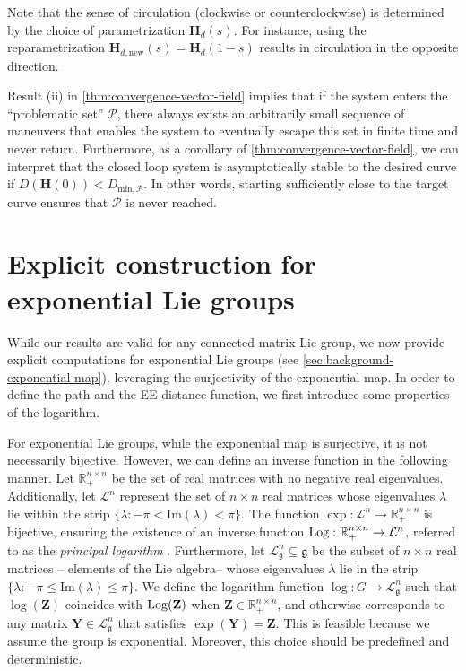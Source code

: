 Note that the sense of circulation (clockwise or counterclockwise) is determined by the choice of parametrization $\mathbf{H}_d(s)$. For instance, using the reparametrization $\mathbf{H}_{d,\text{new}}(s) = \mathbf{H}_d(1-s)$ results in circulation in the opposite direction.

Result (ii) in \cref{thm:convergence-vector-field} implies that if the system enters the ``problematic set'' $\mathcal{P}$, there always exists an arbitrarily small sequence of maneuvers that enables the system to eventually escape this set in finite time and never return. Furthermore, as a corollary of \cref{thm:convergence-vector-field}, we can interpret that the closed loop system is asymptotically stable to the desired curve if $D(\mathbf{H}(0)) < D_{\text{min}, \mathcal{P}}$. In other words, starting sufficiently close to the target curve ensures that $\mathcal{P}$ is never reached.
\section{Explicit construction for exponential Lie groups}\label{sec:kinematic-path-ee-dist-exp-group} %
While our results are valid for any connected matrix Lie group, we now provide explicit computations for exponential Lie groups (see \cref{sec:background-exponential-map}), leveraging the surjectivity of the exponential map. In order to define the path and the EE-distance function, we first introduce some properties of the logarithm.

For exponential Lie groups, while the exponential map is surjective, it is not necessarily bijective. However, we can define an inverse function in the following manner. Let $\mathbb{R}_+^{n\times n}$ be the set of real matrices with no negative real eigenvalues. Additionally, let $\mathcal{L}^n$ represent the set of $n\times n$ real matrices whose eigenvalues $\lambda$ lie within the strip $\{\lambda : -\pi < \text{Im}(\lambda) < \pi\}$. The function $\exp:\mathcal{L}^n\to\mathbb{R}_+^{n\times n}$ is bijective, ensuring the existence of an inverse function $\operatorname{Log}: \mathbb{R}_+^{n\times n} \to \mathcal{L}^n$, referred to as the \emph{principal logarithm} \citep[p. 319]{Gallier2020}. Furthermore, let $\mathcal{L}_{\mathfrak{g}}^n\subseteq\mathfrak{g}$ be the subset of $n \times n$ real matrices -- elements of the Lie algebra-- whose eigenvalues $\lambda$ lie in the strip $\{\lambda : -\pi \le \text{Im}(\lambda) \le \pi\}$. We define the logarithm function $\log:G\to\mathcal{L}_{\mathfrak{g}}^n$ such that $\log(\mathbf{Z})$ coincides with $\operatorname{Log}(\mathbf{Z})$ when $\mathbf{Z}\in\mathbb{R}_+^{n\times n}$, and otherwise corresponds to any matrix $\mathbf{Y}\in\mathcal{L}_{\mathfrak{g}}^n$ that satisfies $\exp(\mathbf{Y}) = \mathbf{Z}$. This is feasible because we assume the group is exponential. Moreover, this choice should be predefined and deterministic.

